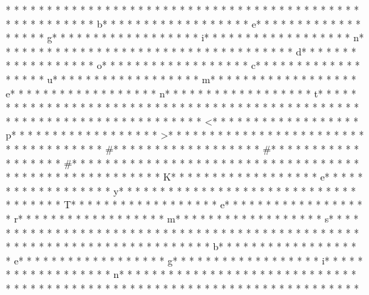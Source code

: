 * * *  * * *  * * *  *  * * *  *  * * *  * %
* * *  * * *  * * *  *  * * *  *  * * *  * 
* * *  * * *  * * *  *  * * *  *  * * *  * b* * *  * * *  * * *  *  * * *  *  * * *  * e* * *  * * *  * * *  *  * * *  *  * * *  * g* * *  * * *  * * *  *  * * *  *  * * *  * i* * *  * * *  * * *  *  * * *  *  * * *  * n* * *  * * *  * * *  *  * * *  *  * * *  * {* * *  * * *  * * *  *  * * *  *  * * *  * d* * *  * * *  * * *  *  * * *  *  * * *  * o* * *  * * *  * * *  *  * * *  *  * * *  * c* * *  * * *  * * *  *  * * *  *  * * *  * u* * *  * * *  * * *  *  * * *  *  * * *  * m* * *  * * *  * * *  *  * * *  *  * * *  * e* * *  * * *  * * *  *  * * *  *  * * *  * n* * *  * * *  * * *  *  * * *  *  * * *  * t* * *  * * *  * * *  *  * * *  *  * * *  * }* * *  * * *  * * *  *  * * *  *  * * *  * 
* * *  * * *  * * *  *  * * *  *  * * *  * 
* * *  * * *  * * *  *  * * *  *  * * *  * <* * *  * * *  * * *  *  * * *  *  * * *  * p* * *  * * *  * * *  *  * * *  *  * * *  * >* * *  * * *  * * *  *  * * *  *  * * *  * 
* * *  * * *  * * *  *  * * *  *  * * *  * #* * *  * * *  * * *  *  * * *  *  * * *  * #* * *  * * *  * * *  *  * * *  *  * * *  * #* * *  * * *  * * *  *  * * *  *  * * *  *  * * *  * * *  * * *  *  * * *  *  * * *  * {* * *  * * *  * * *  *  * * *  *  * * *  * K* * *  * * *  * * *  *  * * *  *  * * *  * e* * *  * * *  * * *  *  * * *  *  * * *  * y* * *  * * *  * * *  *  * * *  *  * * *  *  * * *  * * *  * * *  *  * * *  *  * * *  * T* * *  * * *  * * *  *  * * *  *  * * *  * e* * *  * * *  * * *  *  * * *  *  * * *  * r* * *  * * *  * * *  *  * * *  *  * * *  * m* * *  * * *  * * *  *  * * *  *  * * *  * s* * *  * * *  * * *  *  * * *  *  * * *  * }* * *  * * *  * * *  *  * * *  *  * * *  * 
* * *  * * *  * * *  *  * * *  *  * * *  * 
* * *  * * *  * * *  *  * * *  *  * * *  * b* * *  * * *  * * *  *  * * *  *  * * *  * e* * *  * * *  * * *  *  * * *  *  * * *  * g* * *  * * *  * * *  *  * * *  *  * * *  * i* * *  * * *  * * *  *  * * *  *  * * *  * n* * *  * * *  * * *  *  * * *  *  * * *  * {* * *  * * *  * * *  *  * * *  *  * * *  *  * * *  * * *  * * *  *  * * *  *  * * *  * }* * *  * * *  * * *  *  * * *  *  * * *  * 
